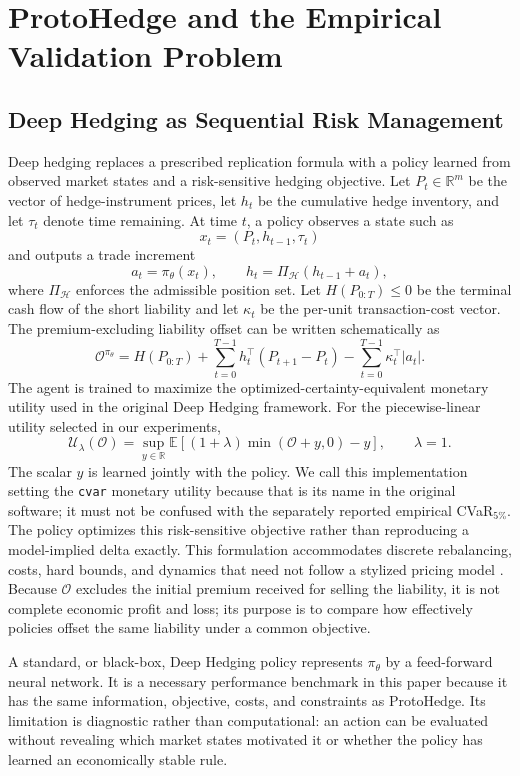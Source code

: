 \documentclass[sigconf]{acmart}
\begin{document}
\section{ProtoHedge and the Empirical Validation Problem}
\label{sec:protohedge_empirical_problem}

\subsection{Deep Hedging as Sequential Risk Management}
\label{subsec:deep_hedging_background}

Deep hedging replaces a prescribed replication formula with a policy learned
from observed market states and a risk-sensitive hedging objective. Let
$P_t \in \mathbb{R}^m$ be the vector of hedge-instrument prices, let $h_t$ be
the cumulative hedge inventory, and let $\tau_t$ denote time remaining. At
time $t$, a policy observes a state such as
\[
x_t = (P_t, h_{t-1}, \tau_t)
\]
and outputs a trade increment
\[
a_t = \pi_\theta(x_t), \qquad
h_t = \Pi_{\mathcal{H}}(h_{t-1}+a_t),
\]
where $\Pi_{\mathcal{H}}$ enforces the admissible position set. Let
$H(P_{0:T})\leq 0$ be the terminal cash flow of the short liability and let
$\kappa_t$ be the per-unit transaction-cost vector. The premium-excluding
liability offset can be written schematically as
\[
\mathcal{O}^{\pi_\theta}
=
H(P_{0:T})
+
\sum_{t=0}^{T-1} h_t^\top(P_{t+1}-P_t)
-
\sum_{t=0}^{T-1}\kappa_t^\top |a_t|.
\]
The agent is trained to maximize the optimized-certainty-equivalent monetary
utility used in the original Deep Hedging framework. For the piecewise-linear
utility selected in our experiments,
\[
\mathcal{U}_{\lambda}(\mathcal{O})
=
\sup_{y\in\mathbb{R}}
\mathbb{E}\!\left[
(1+\lambda)\min(\mathcal{O}+y,0)-y
\right],
\qquad \lambda=1.
\]
The scalar $y$ is learned jointly with the policy. We call this implementation
setting the \texttt{cvar} monetary utility because that is its name in the
original software; it must not be confused with the separately reported
empirical CVaR$_{5\%}$. The policy optimizes this risk-sensitive objective
rather than reproducing a model-implied delta exactly. This formulation
accommodates discrete rebalancing, costs, hard bounds, and dynamics that need
not follow a stylized pricing model \cite{buehler2019deep}. Because
$\mathcal{O}$ excludes the
initial premium received for selling the liability, it is not complete
economic profit and loss; its purpose is to compare how effectively policies
offset the same liability under a common objective.

A standard, or black-box, Deep Hedging policy represents $\pi_\theta$ by a
feed-forward neural network. It is a necessary performance benchmark in this
paper because it has the same information, objective, costs, and constraints
as ProtoHedge. Its limitation is diagnostic rather than computational: an
action can be evaluated without revealing which market states motivated it or
whether the policy has learned an economically stable rule.
\end{document}
